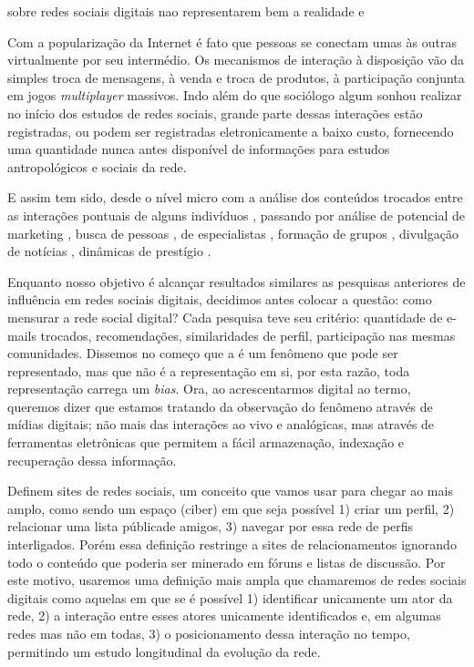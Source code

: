 \documentclass{article}
\begin{document}
\cite{Clemons2007} sobre redes sociais digitais nao representarem bem a
realidade
\cite{Richardson2002} e \cite{Domingos2001}

Com a popularização da Internet é fato que pessoas se conectam umas às outras
virtualmente por seu intermédio. Os mecanismos de interação à disposição vão da
simples troca de mensagens, à venda e troca de produtos, à participação conjunta
em jogos \textit{multiplayer} massivos. Indo além do que sociólogo algum sonhou
realizar no início dos estudos de redes sociais, grande parte dessas interações
estão registradas, ou podem ser registradas eletronicamente a baixo custo,
fornecendo uma quantidade nunca antes disponível de informações para
estudos antropológicos e sociais da rede.

E assim tem sido, desde o nível micro com a análise dos conteúdos trocados
entre as interações pontuais de alguns indivíduos \cite{Recuero2008}, passando
por análise de potencial de marketing
\cite{Clemons2007}\cite{Domingos2001}\cite{Richardson2002}\cite{Ma2008}, busca
de pessoas \cite{ADAMIC2005}, de especialistas \cite{Ehrlich2007}, formação de
grupos \cite{Adamic2003}\cite{Backstrom2006}\cite{Kumar2006}, divulgação de
notícias \cite{Gruhl2004}, dinâmicas de prestígio
\cite{Salganik2006}\cite{Song2007}.

Enquanto nosso objetivo é alcançar resultados similares as pesquisas anteriores
de influência em redes sociais digitais, decidimos antes colocar a questão: como
mensurar a rede social digital? Cada pesquisa teve seu critério: quantidade de
e-mails trocados, recomendações, similaridades de perfil, participação nas mesmas
comunidades. Dissemos no começo que a \observednet é um fenômeno que pode ser
representado, mas que não é a representação em si, por esta razão, toda
representação carrega um \textit{bias}. Ora, ao acrescentarmos digital ao termo,
queremos dizer que estamos tratando da observação do fenômeno através de mídias
digitais; não mais das interações ao vivo e analógicas, mas através de
ferramentas eletrônicas que permitem a fácil armazenação, indexação e recuperação
dessa informação.



Definem sites de redes sociais, um conceito que vamos usar para
chegar ao mais amplo, como sendo um espaço (ciber) em que seja possível 1) criar
um perfil, 2) relacionar uma lista públicade amigos, 3) navegar por essa rede de
perfis interligados. Porém essa definição restringe a sites de relacionamentos
ignorando todo o conteúdo que poderia ser minerado em fóruns e listas de
discussão. Por este motivo, usaremos uma definição mais ampla que chamaremos de
redes sociais digitais como aquelas em que se é possível 1) identificar
unicamente um ator da rede, 2) a interação entre esses atores unicamente
identificados e, em algumas redes mas não em todas, 3) o posicionamento dessa
interação no tempo, permitindo um estudo longitudinal da evolução da rede.
\end{document}
